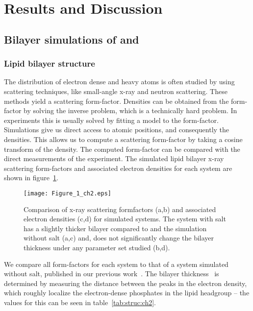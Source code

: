 \section{Results and Discussion}
\subsection{Bilayer simulations of \li and \mg}
\subsubsection{Lipid bilayer structure}
The distribution of electron dense and heavy atoms is often studied by using
scattering techniques, like small-angle x-ray and neutron scattering. 
These methods
yield a scattering form-factor.  Densities can be obtained from the form-factor by solving
the inverse problem, which is a technically hard problem. In experiments this is usually solved by fitting a model to the form-factor.
Simulations give us direct access to atomic positions, and consequently
the densities. This allows us to compute a scattering form-factor by taking a cosine transform of the density{. The computed
form-factor}
can be compared with the direct measurements of the experiment.
The simulated lipid bilayer x-ray scattering form-factors and associated 
electron densities for each system are shown in figure~\ref{fig:eledens:ch2}.
\begin{figure}[h!]
    \caption[Formfactors and electron densities]{Comparison of x-ray scattering formfactors (a,b) and associated electron densities (c,d) for simulated systems. 
    {The system with \li salt has a slightly thicker bilayer compared to \na and the simulation without salt (a,c) and},
    \mg does not significantly change the bilayer thickness
    under any parameter set studied (b,d). }
    \label{fig:eledens:ch2}
    \texttt{[image: Figure\_1\_ch2.eps]}
\end{figure}
We compare all form-factors for each system to that of a system simulated without salt, published
in our previous work~\cite{kruczek:2017}.
The bilayer thickness \dhh~is determined by measuring the distance between the
peaks in the electron density, which roughly localize the electron-dense phosphates in the
lipid headgroup -- the values for this can be seen in table~\ref{tab:struc:ch2}.
